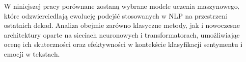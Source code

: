 W niniejszej pracy porównane zostaną wybrane modele uczenia maszynowego, które odzwierciedlają ewolucję podejść stosowanych w NLP na przestrzeni ostatnich dekad. Analiza obejmie zarówno klasyczne metody, jak i nowoczesne architektury oparte na sieciach neuronowych i transformatorach, umożliwiając ocenę ich skuteczności oraz efektywności w kontekście klasyfikacji sentymentu i emocji w tekstach.

\endinput